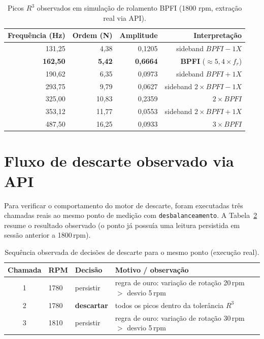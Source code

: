 \begin{table}[htbp]
\centering
\caption{Picos \(R^3\) observados em simulação de rolamento BPFI (1800 rpm, extração real via API).}
\label{tab:bpfi-picos}
\begin{tabular}{@{}rrrr@{}}
\toprule
\textbf{Frequência (Hz)} & \textbf{Ordem (N)} & \textbf{Amplitude} & \textbf{Interpretação} \\
\midrule
131,25 & 4,38 & 0,1205 & sideband \(BPFI - 1X\) \\
\textbf{162,50} & \textbf{5,42} & \textbf{0,6664} & \textbf{BPFI} ($\approx 5{,}4\times f_r$) \\
190,62 & 6,35 & 0,0973 & sideband \(BPFI + 1X\) \\
293,75 & 9,79 & 0,0627 & sideband \(2\times BPFI - 1X\) \\
325,00 & 10,83 & 0,2359 & \(2\times BPFI\) \\
353,12 & 11,77 & 0,0553 & sideband \(2\times BPFI + 1X\) \\
487,50 & 16,25 & 0,0933 & \(3\times BPFI\) \\
\bottomrule
\end{tabular}
\par{}
\end{table}

\section{Fluxo de descarte observado via API}

Para verificar o comportamento do motor de descarte, foram executadas três
chamadas reais ao mesmo ponto de medição com \texttt{desbalanceamento}. A
Tabela~\ref{tab:descarte} resume o resultado observado (o ponto já possuía uma
leitura persistida em sessão anterior a 1800\,rpm).

\begin{table}[htbp]
\centering
\caption{Sequência observada de decisões de descarte para o mesmo ponto (execução real).}
\label{tab:descarte}
\begin{tabular}{@{}clll@{}}
\toprule
\textbf{Chamada} & \textbf{RPM} & \textbf{Decisão} & \textbf{Motivo / observação} \\
\midrule
1 & 1780 & persistir & regra de ouro: variação de rotação 20\,rpm $>$ desvio 5\,rpm \\
2 & 1780 & \textbf{descartar} & todos os picos dentro da tolerância \(R^3\) \\
3 & 1810 & persistir & regra de ouro: variação de rotação 30\,rpm $>$ desvio 5\,rpm \\
\bottomrule
\end{tabular}
\par{}
\end{table}

